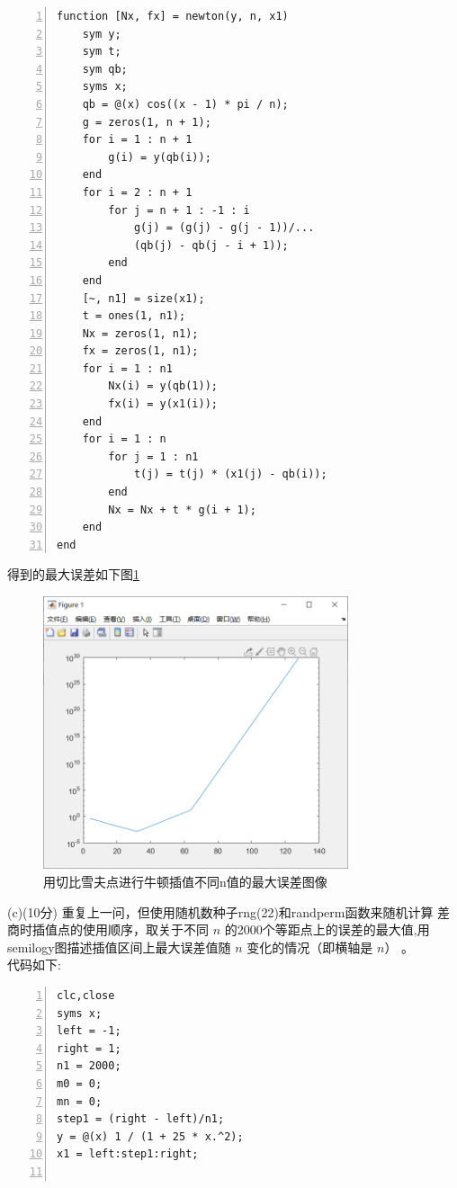 \documentclass[12pt,a4paper,UTF8]{ctexart}
\begin{document}
\begin{enumerate}
\begin{lstlisting}[frame=single,numbers=left]
function [Nx, fx] = newton(y, n, x1)
    sym y;  
    sym t;
    sym qb;
    syms x;
    qb = @(x) cos((x - 1) * pi / n);
    g = zeros(1, n + 1);
    for i = 1 : n + 1
        g(i) = y(qb(i));
    end
    for i = 2 : n + 1
        for j = n + 1 : -1 : i
            g(j) = (g(j) - g(j - 1))/...
			(qb(j) - qb(j - i + 1));
        end
    end
    [~, n1] = size(x1);
    t = ones(1, n1);
    Nx = zeros(1, n1);
    fx = zeros(1, n1);
    for i = 1 : n1        
        Nx(i) = y(qb(1));
        fx(i) = y(x1(i));
    end
    for i = 1 : n
        for j = 1 : n1
            t(j) = t(j) * (x1(j) - qb(i));
        end
        Nx = Nx + t * g(i + 1);
    end
end
\end{lstlisting}

	得到的最大误差如下图\ref{jpg:5}\\
	\begin{figure}[H]
		\centering
     	\includegraphics[width=0.8\textwidth]{5.png}
    	\caption{用切比雪夫点进行牛顿插值不同n值的最大误差图像}\label{jpg:5}
	\end{figure}
	
	(c)(10分) 重复上一问，但使用随机数种子rng(22)和randperm函数来随机计算 差商时插值点的使用顺序，取关于不同 $n$ 的2000个等距点上的误差的最大值,用semilogy图描述插值区间上最大误差值随 $n$ 变化的情况（即横轴是 $n$） 。\\

	代码如下:\\
\begin{lstlisting}[frame=single,numbers=left]
clc,close
syms x;
left = -1;
right = 1;
n1 = 2000;
m0 = 0;
mn = 0;
step1 = (right - left)/n1;
y = @(x) 1 / (1 + 25 * x.^2);
x1 = left:step1:right;


\end{lstlisting}
\end{enumerate}
\end{document}
